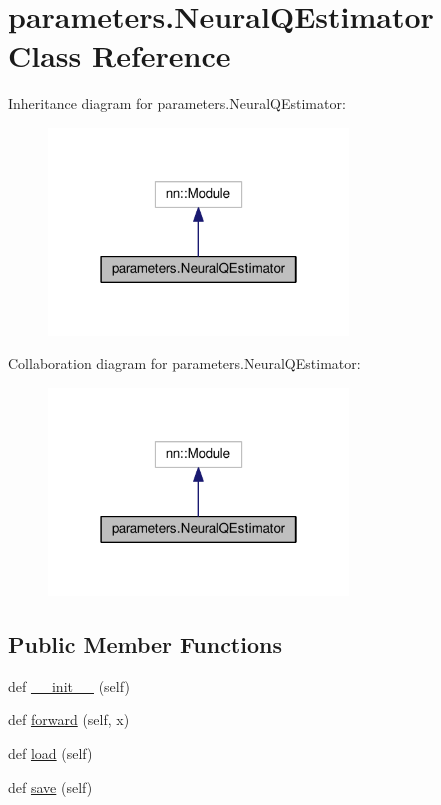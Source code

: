 \hypertarget{classparameters_1_1_neural_q_estimator}{}\section{parameters.\+Neural\+Q\+Estimator Class Reference}
\label{classparameters_1_1_neural_q_estimator}


Inheritance diagram for parameters.\+Neural\+Q\+Estimator\+:
\nopagebreak
\begin{figure}[H]
\begin{center}
\leavevmode
\includegraphics[width=226pt]{classparameters_1_1_neural_q_estimator__inherit__graph}
\end{center}
\end{figure}


Collaboration diagram for parameters.\+Neural\+Q\+Estimator\+:
\nopagebreak
\begin{figure}[H]
\begin{center}
\leavevmode
\includegraphics[width=226pt]{classparameters_1_1_neural_q_estimator__coll__graph}
\end{center}
\end{figure}
\subsection*{Public Member Functions}
\begin{DoxyCompactItemize}
\item 
def \hyperlink{classparameters_1_1_neural_q_estimator_ad820dedb1b53b0967f466939c69145c0}{\+\_\+\+\_\+init\+\_\+\+\_\+} (self)
\item 
def \hyperlink{classparameters_1_1_neural_q_estimator_acadb108832a386bbe20ad80015a2ed06}{forward} (self, x)
\item 
def \hyperlink{classparameters_1_1_neural_q_estimator_acd78f9e6bdd4cdda419ee5d83363ddd3}{load} (self)
\item 
def \hyperlink{classparameters_1_1_neural_q_estimator_a4efb1e7f7a7f77770cbd2a379ff2db8a}{save} (self)
\end{DoxyCompactItemize}
